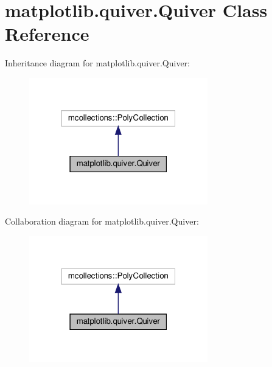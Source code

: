 \hypertarget{classmatplotlib_1_1quiver_1_1Quiver}{}\section{matplotlib.\+quiver.\+Quiver Class Reference}
\label{classmatplotlib_1_1quiver_1_1Quiver}


Inheritance diagram for matplotlib.\+quiver.\+Quiver\+:
\nopagebreak
\begin{figure}[H]
\begin{center}
\leavevmode
\includegraphics[width=220pt]{classmatplotlib_1_1quiver_1_1Quiver__inherit__graph}
\end{center}
\end{figure}


Collaboration diagram for matplotlib.\+quiver.\+Quiver\+:
\nopagebreak
\begin{figure}[H]
\begin{center}
\leavevmode
\includegraphics[width=220pt]{classmatplotlib_1_1quiver_1_1Quiver__coll__graph}
\end{center}
\end{figure}
